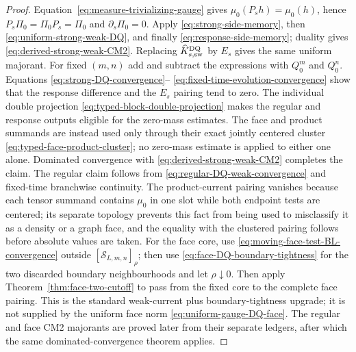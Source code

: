 \documentclass[11pt]{article}
\begin{document}
\begin{proof}
Equation~\eqref{eq:measure-trivializing-gauge} gives
$\mu_0(P_sh)=\mu_0(h)$, hence $P_s\Pi_0=\Pi_0P_s=\Pi_0$ and
$\partial_s\Pi_0=0$.  Apply \eqref{eq:strong-side-memory}, then
\eqref{eq:uniform-strong-weak-DQ}, and finally
\eqref{eq:response-side-memory}; duality gives
\eqref{eq:derived-strong-weak-CM2}.  Replacing
$\widehat K_{s,\rm sw}^{\rm DQ}$ by $E_s$ gives the same uniform majorant.
For fixed $(m,n)$ add and subtract the expressions with $Q_0^m$ and $Q_0^n$.
Equations \eqref{eq:strong-DQ-convergence}--
\eqref{eq:fixed-time-evolution-convergence} show that the response difference
and the $E_s$ pairing tend to zero.  The individual double projection
\eqref{eq:typed-block-double-projection} makes the regular and response
outputs eligible for the zero-mass estimates.  The face and product
summands are instead used only through their exact jointly centered cluster
\eqref{eq:typed-face-product-cluster}; no zero-mass estimate is applied to
either one alone.  Dominated
convergence with \eqref{eq:derived-strong-weak-CM2} completes the claim.  The
regular claim follows from
\eqref{eq:regular-DQ-weak-convergence} and fixed-time branchwise continuity.
The product-current pairing vanishes because each tensor summand contains
$\mu_0$ in one slot while both endpoint tests are centered; its separate
topology prevents this fact from being used to misclassify it as a density
or a graph face, and the equality with the clustered pairing follows before
absolute values are taken.  For the face core, use
\eqref{eq:moving-face-test-BL-convergence} outside
$[\mathcal S_{L,m,n}]_\rho$; then use
\eqref{eq:face-DQ-boundary-tightness} for the two discarded boundary
neighbourhoods and let $\rho\downarrow0$.  Then apply
Theorem~\ref{thm:face-two-cutoff} to pass from the fixed core to the complete
face pairing.  This is the standard
weak-current plus boundary-tightness upgrade; it is not supplied by the
uniform face norm \eqref{eq:uniform-gauge-DQ-face}.  The regular and face
CM2 majorants are proved later from their separate ledgers, after which the
same dominated-convergence theorem applies.
\end{proof}
\end{document}
